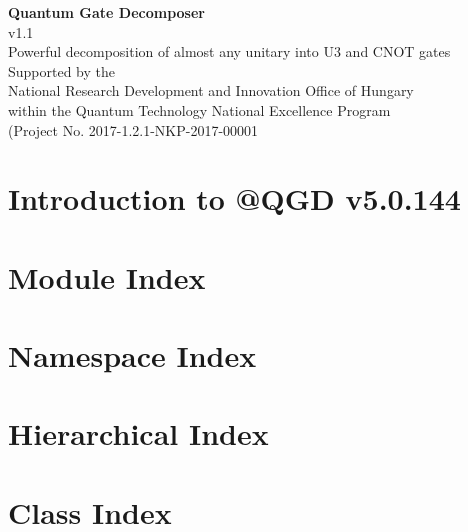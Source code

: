 \documentclass[twoside]{book}
\newcommand{\+}{\discretionary{\mbox{\scriptsize$\hookleftarrow$}}{}{}}
\newcommand{\clearemptydoublepage}{%
  \newpage{\pagestyle{empty}\cleardoublepage}%
}
\begin{document}
\hypersetup{pageanchor=false,
             bookmarks=true,
             bookmarksnumbered=true,
             pdfencoding=unicode
            }
\begin{titlepage}
\vspace*{3cm}
\begin{center}%
{\Huge \textbf{Quantum Gate Decomposer} \\
[1ex]\Large v1.1 }\\
\vspace*{2.5cm}
\vspace*{0.5cm}
{\Large Powerful decomposition of almost any unitary into U3 and CNOT gates} \\
\vspace*{3.5cm}
{\Large Supported by the} \\
\vspace*{0.5cm}
{\LARGE National Research Development and Innovation Office of Hungary} \\
\vspace*{0.5cm}
{\large within the Quantum Technology National Excellence Program \\ (Project No. 2017-1.2.1-NKP-2017-00001}
\end{center}
\end{titlepage}
\clearemptydoublepage
\tableofcontents
\clearemptydoublepage
{}
\hypersetup{pageanchor=true}
\chapter{Introduction to @Q\+GD v5.0.144}
\label{index}\hypertarget{index}{}
\chapter{Module Index}

\chapter{Namespace Index}

\chapter{Hierarchical Index}

\chapter{Class Index}

\end{document}
